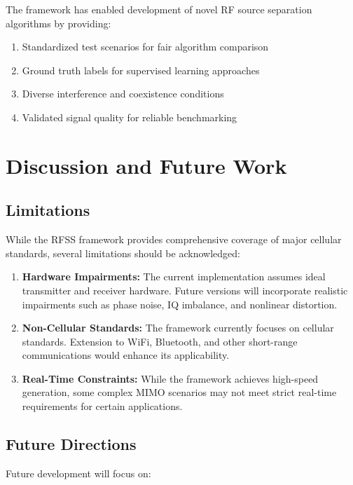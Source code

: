 \documentclass[conference]{IEEEtran}
\begin{document}
The framework has enabled development of novel RF source separation algorithms by providing:

\begin{enumerate}
\item Standardized test scenarios for fair algorithm comparison
\item Ground truth labels for supervised learning approaches  
\item Diverse interference and coexistence conditions
\item Validated signal quality for reliable benchmarking
\end{enumerate}

\section{Discussion and Future Work}

\subsection{Limitations}

While the RFSS framework provides comprehensive coverage of major cellular standards, several limitations should be acknowledged:

\begin{enumerate}
\item \textbf{Hardware Impairments:} The current implementation assumes ideal transmitter and receiver hardware. Future versions will incorporate realistic impairments such as phase noise, IQ imbalance, and nonlinear distortion.

\item \textbf{Non-Cellular Standards:} The framework currently focuses on cellular standards. Extension to WiFi, Bluetooth, and other short-range communications would enhance its applicability.

\item \textbf{Real-Time Constraints:} While the framework achieves high-speed generation, some complex MIMO scenarios may not meet strict real-time requirements for certain applications.
\end{enumerate}

\subsection{Future Directions}

Future development will focus on:
\end{document}

